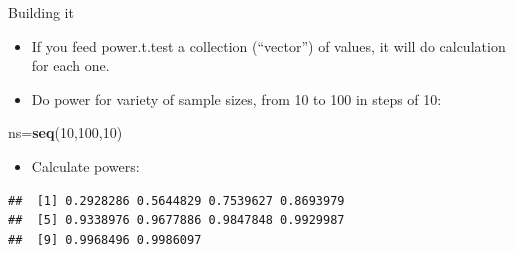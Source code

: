 \documentclass[
  ignorenonframetext,
]{beamer}
\newenvironment{Shaded}{\begin{snugshade}}{\end{snugshade}}
\newcommand{\DataTypeTok}[1]{\textcolor[rgb]{0.13,0.29,0.53}{#1}}
\newcommand{\DecValTok}[1]{\textcolor[rgb]{0.00,0.00,0.81}{#1}}
\newcommand{\KeywordTok}[1]{\textcolor[rgb]{0.13,0.29,0.53}{\textbf{#1}}}
\newcommand{\NormalTok}[1]{#1}
\newcommand{\OperatorTok}[1]{\textcolor[rgb]{0.81,0.36,0.00}{\textbf{#1}}}
\newcommand{\StringTok}[1]{\textcolor[rgb]{0.31,0.60,0.02}{#1}}
\providecommand{\tightlist}{%
  \setlength{\itemsep}{0pt}\setlength{\parskip}{0pt}}
\begin{document}
\begin{frame}[fragile]{Building it}
\protect\hypertarget{building-it}{}

\begin{itemize}
\tightlist
\item
  If you feed power.t.test a collection (``vector'') of values, it will
  do calculation for each one.
\item
  Do power for variety of sample sizes, from 10 to 100 in steps of 10:
\end{itemize}

\begin{Shaded}
\begin{Highlighting}[]
\NormalTok{ns=}\KeywordTok{seq}\NormalTok{(}\DecValTok{10}\NormalTok{,}\DecValTok{100}\NormalTok{,}\DecValTok{10}\NormalTok{)}
\end{Highlighting}
\end{Shaded}

\begin{itemize}
\tightlist
\item
  Calculate powers:
\end{itemize}

\begin{Shaded}
\end{Shaded}

\begin{verbatim}
##  [1] 0.2928286 0.5644829 0.7539627 0.8693979
##  [5] 0.9338976 0.9677886 0.9847848 0.9929987
##  [9] 0.9968496 0.9986097
\end{verbatim}

\end{frame}
\end{document}
